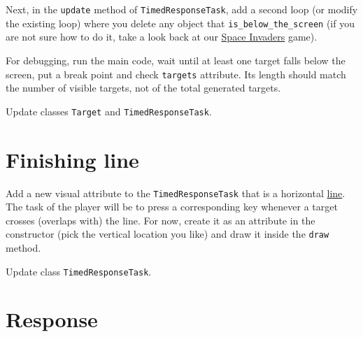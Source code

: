 \documentclass[
]{book}
\begin{document}
Next, in the \texttt{update} method of \texttt{TimedResponseTask}, add a second loop (or modify the existing loop) where you delete any object that \texttt{is\_below\_the\_screen} (if you are not sure how to do it, take a look back at our \protect\hyperlink{seminar-02-05}{Space Invaders} game).

For debugging, run the main code, wait until at least one target falls below the screen, put a break point and check \texttt{targets} attribute. Its length should match the number of visible targets, not of the total generated targets.

Update classes \texttt{Target} and \texttt{TimedResponseTask}.

\hypertarget{finishing-line}{%
\section{Finishing line}\label{finishing-line}}

Add a new visual attribute to the \texttt{TimedResponseTask} that is a horizontal \href{https://psychopy.org/api/visual/line.html\#psychopy.visual.Line}{line}. The task of the player will be to press a corresponding key whenever a target crosses (overlaps with) the line. For now, create it as an attribute in the constructor (pick the vertical location you like) and draw it inside the \texttt{draw} method.

Update class \texttt{TimedResponseTask}.

\hypertarget{response}{%
\section{Response}\label{response}}
\end{document}
